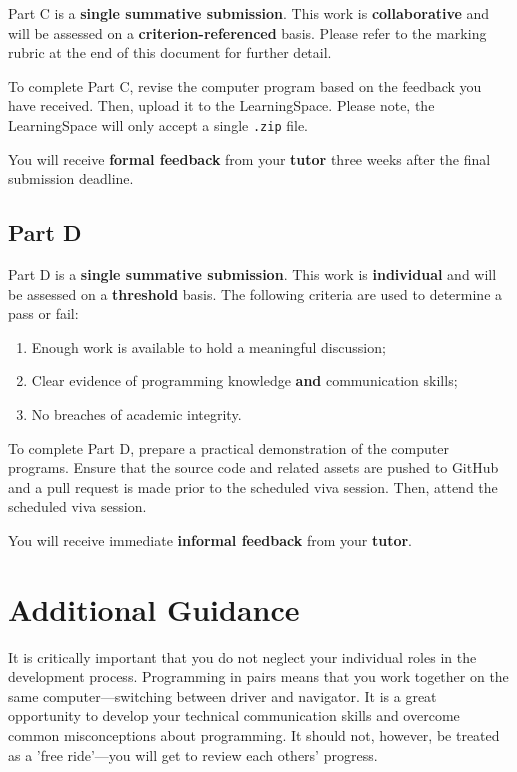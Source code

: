 \documentclass{../../fal_assignment}
\begin{document}
Part C is a \textbf{single summative submission}. This work is \textbf{collaborative} and will be assessed on a \textbf{criterion-referenced} basis. Please refer to the marking rubric at the end of this document for further detail.

To complete Part C, revise the computer program based on the feedback you have received. Then, upload it to the LearningSpace. Please note, the LearningSpace will only accept a single \texttt{.zip} file.

You will receive \textbf{formal feedback} from your \textbf{tutor} three weeks after the final submission deadline.

\subsection*{Part D}

Part D is a \textbf{single summative submission}. This work is \textbf{individual} and will be assessed on a \textbf{threshold} basis.  The following criteria are used to determine a pass or fail:

\begin{enumerate}[label=(\alph*)]
	\item Enough work is available to hold a meaningful discussion;
	\item Clear evidence of programming knowledge \textbf{and} communication skills;
	\item No breaches of academic integrity.
\end{enumerate}

To complete Part D, prepare a practical demonstration of the computer programs. Ensure that the source code and related assets are pushed to GitHub and a pull request is made prior to the scheduled viva session. Then, attend the scheduled viva session.

You will receive immediate \textbf{informal feedback} from your \textbf{tutor}.

\section*{Additional Guidance}

It is critically important that you do not neglect your individual roles in the development process. Programming in pairs means that you work together on the same computer---switching between driver and navigator. It is a great opportunity to develop your technical communication skills and overcome common misconceptions about programming. It should not, however, be treated as a 'free ride'---you will get to review each others' progress. 
\end{document}
